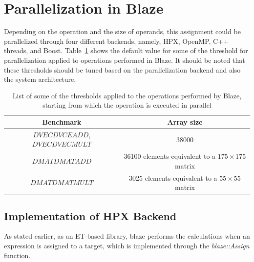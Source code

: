 \vspace{\baselineskip}	
\section{Parallelization in Blaze}
Depending on the operation and the size of operands, this assignment could be parallelized through four different backends, namely, HPX, OpenMP\cite{dagum1998openmp}, C++ threads, and Boost\cite{Boost}. 
Table~\ref{table2} shows the default value for some of the threshold for parallelization applied to operations performed in Blaze. It should be noted that these thresholds should be tuned based on the parallelization backend and also the system architecture.

\vspace{\baselineskip}	
\begin{table}[H]
	\centering
	\resizebox{\textwidth}{!}
	{\begin{tabular}{|c | c |} 
			\hline
			Benchmark & Array size \\ [0.5ex] 
			\hline
			\hline
			$DVECDVCEADD$, $DVECDVECMULT$ & 38000\\ 	
			\hline
			$DMATDMATADD$ & 36100 elements equivalent to a $175\times{175}$ matrix \\
			\hline	
			$DMATDMATMULT$ & 3025 elements equivalent to a $55\times{55}$ matrix  \\
			\hline			
	\end{tabular}}
	
	\caption{List of some of the thresholds applied to the operations performed by Blaze, starting from which the operation is executed in parallel}
	\label{table2}
\end{table} 

\vspace{\baselineskip}	
\subsection{Implementation of HPX Backend}
As stated earlier, as an ET-based library, blaze performs the calculations when an expression is assigned to a target, which is implemented through the \textit{blaze::Assign} function.

